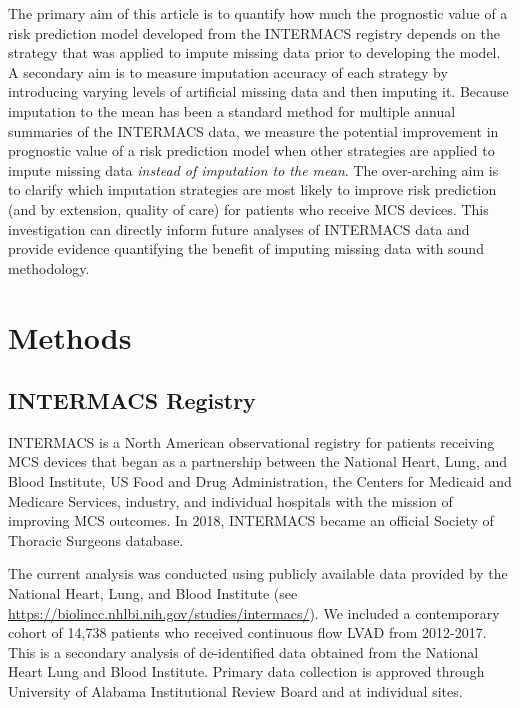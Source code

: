\documentclass{article}
\begin{document}
The primary aim of this article is to quantify how much the prognostic
value of a risk prediction model developed from the INTERMACS registry
depends on the strategy that was applied to impute missing data prior to
developing the model. A secondary aim is to measure imputation accuracy
of each strategy by introducing varying levels of artificial missing
data and then imputing it. Because imputation to the mean has been a
standard method for multiple annual summaries of the INTERMACS data, we
measure the potential improvement in prognostic value of a risk
prediction model when other strategies are applied to impute missing
data \emph{instead of imputation to the mean}. The over-arching aim is
to clarify which imputation strategies are most likely to improve risk
prediction (and by extension, quality of care) for patients who receive
MCS devices. This investigation can directly inform future analyses of
INTERMACS data and provide evidence quantifying the benefit of imputing
missing data with sound methodology.

\hypertarget{methods}{%
\section{Methods}\label{methods}}

\label{sec:methods}

\hypertarget{intermacs-registry}{%
\subsection{INTERMACS Registry}\label{intermacs-registry}}

\label{subsec:intermacs}

INTERMACS is a North American observational registry for patients
receiving MCS devices that began as a partnership between the National
Heart, Lung, and Blood Institute, US Food and Drug Administration, the
Centers for Medicaid and Medicare Services, industry, and individual
hospitals with the mission of improving MCS outcomes. In 2018, INTERMACS
became an official Society of Thoracic Surgeons database.

The current analysis was conducted using publicly available data
provided by the National Heart, Lung, and Blood Institute (see
\url{https://biolincc.nhlbi.nih.gov/studies/intermacs/}). We included a
contemporary cohort of 14,738 patients who received continuous flow LVAD
from 2012-2017. This is a secondary analysis of de-identified data
obtained from the National Heart Lung and Blood Institute. Primary data
collection is approved through University of Alabama Institutional
Review Board and at individual sites.
\end{document}

